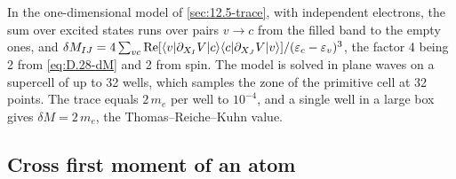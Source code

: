 In the one-dimensional model of \cref{sec:12.5-trace}, with independent electrons, the sum over excited states runs over pairs $v \to c$ from the filled band to the empty ones, and $\delta M_{IJ} = 4\sum_{vc}\operatorname{Re}[\langle v|\partial_{X_I}V|c\rangle\langle c|\partial_{X_J}V|v\rangle]/(\varepsilon_c - \varepsilon_v)^3$, the factor 4 being 2 from \cref{eq:D.28-dM} and 2 from spin. The model is solved in plane waves on a supercell of up to 32 wells, which samples the zone of the primitive cell at 32 points. The trace equals $2\,m_e$ per well to $10^{-4}$, and a single well in a large box gives $\delta M = 2\,m_e$, the Thomas--Reiche--Kuhn value.

\subsection{Cross first moment of an atom}\label{app:D.34-cross}

